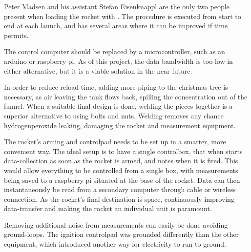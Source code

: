 Peter Madsen and his assistant Stefan Eisenknappl are the only two people present when loading the rocket with . The procedure is executed from start to end at each launch, and has several areas where it can be improved if time permits.

The control computer should be replaced by a microcontroller, such as an arduino or raspberry pi. As of this project, the data bandwidth is too low in either alternative, but it is a viable solution in the near future.

In order to reduce reload time, adding more piping to the christmas tree is necessary, as air leaving the  tank flows back, spilling the  concentration out of the funnel. When a suitable final design is done, welding the pieces together is a superior alternative to using bolts and nuts. Welding removes any chance hydrogenperoxide leaking, damaging the rocket and measurement equipment.

The rocket's arming and controlpad needs to be set up in a smarter, more convenient way. The ideal setup is to have a single controlbox, that when starts data-collection as soon as the rocket is armed, and notes when it is fired. This would allow everything to be controlled from a single box, with measurements being saved to a raspberry pi situated at the base of the rocket. Data can then instantaneously be read from a secondary computer through cable or wireless connection. As the rocket's final destination is space, continuously improving data-transfer and making the rocket an individual unit is paramount.

Removing additional noise from measurements can easily be done avoiding ground-loops. The ignition controlpad was grounded differently than the other equipment, which introduced another way for electricity to run to ground.
